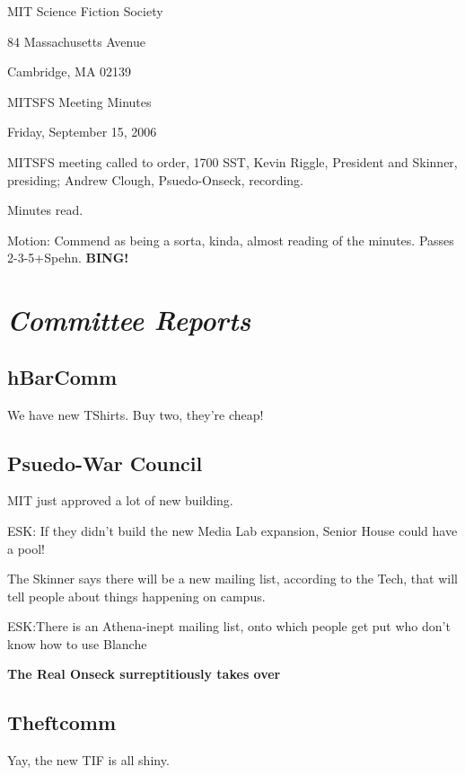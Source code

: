 \documentclass[10pt]{article}
\newcommand{\bing}{{\bf BING!} }
\newcommand{\goto}[1]{\bing \vskip 12pt \section*{{\em{#1}}}}
\begin{document}
\begin{center}

MIT Science Fiction Society

84 Massachusetts Avenue

Cambridge, MA 02139

\vspace{12pt}

MITSFS Meeting Minutes

Friday, September 15, 2006

\end{center}

\vspace{18pt}

\setlength{\parskip}{6pt}

\noindent
MITSFS meeting called to order, 1700 SST,
Kevin Riggle, President and Skinner, presiding; Andrew Clough, Psuedo-Onseck, recording.

Minutes read.

Motion:  Commend as being a sorta, kinda, almost reading of the minutes.  Passes 2-3-5+Spehn.
\goto{Committee Reports}

\subsection{hBarComm}

We have new TShirts.  Buy two, they're cheap!  


\subsection*{Psuedo-War Council}

MIT just approved a lot of new building.

ESK:  If they didn't build the new Media Lab expansion, Senior House could have a pool!

The Skinner says there will be a new mailing list, according to the
Tech, that will tell people about things happening on campus.
 
ESK:There is an Athena-inept mailing list, onto which people get put who
don't know how to use Blanche

\textbf{The Real Onseck surreptitiously takes over}

\subsection*{Theftcomm}
Yay, the new TIF is all shiny.
\end{document}
